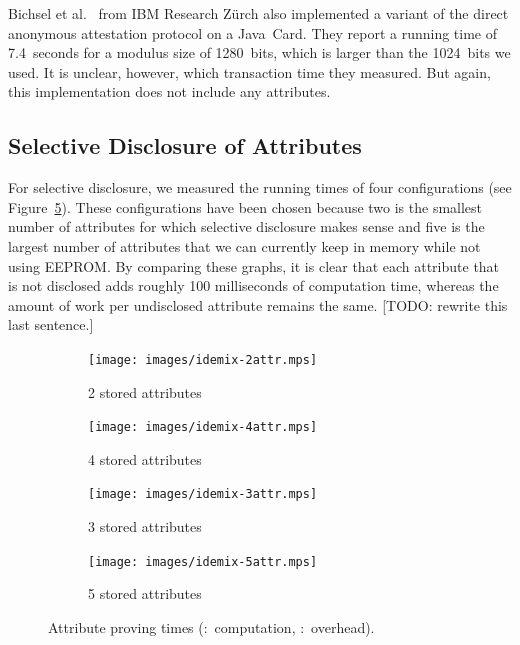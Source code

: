 Bichsel et al.~\cite{BichselCGS2009} from IBM Research Z\"urch also implemented
a variant of the direct anonymous attestation protocol on a Java~Card. They
report a running time of 7.4~seconds for a modulus size of 1280~bits, which is
larger than the 1024~bits we used. It is unclear, however, which transaction
time they measured. But again, this implementation does not include any
attributes.

\subsection{Selective Disclosure of Attributes}

For selective disclosure, we measured the running times of four configurations
(see Figure~\ref{fig:proving}). These configurations have been chosen because
two is the smallest number of attributes for which selective disclosure makes
sense and five is the largest number of attributes that we can currently keep in
memory while not using EEPROM. By comparing these graphs, it is clear that each
attribute that is not disclosed adds roughly 100 milliseconds of computation
time, whereas the amount of work per undisclosed attribute remains the same.
[TODO: rewrite this last sentence.]

\begin{figure}[ht]
  \centering
  \begin{subfigure}[b]{0.45\textwidth}
    \texttt{[image: images/idemix-2attr.mps]}
    \caption{2 stored attributes}
    \label{fig:2attr-sle78}
  \end{subfigure}
  \begin{subfigure}[b]{0.45\textwidth}
    \texttt{[image: images/idemix-4attr.mps]}
    \caption{4 stored attributes}
    \label{fig:4attr-sle78}
  \end{subfigure}

  \vspace{5mm}

  \begin{subfigure}[b]{0.45\textwidth}
    \texttt{[image: images/idemix-3attr.mps]}
    \caption{3 stored attributes}
    \label{fig:3attr-sle78}
  \end{subfigure}
  \begin{subfigure}[b]{0.45\textwidth}
    \texttt{[image: images/idemix-5attr.mps]}
    \caption{5 stored attributes}
    \label{fig:5attr-sle78}
  \end{subfigure}

  \caption[Attribute proving times.]{
    Attribute proving times
    (:~computation,
      :~overhead).}
  \label{fig:proving}
\end{figure}

